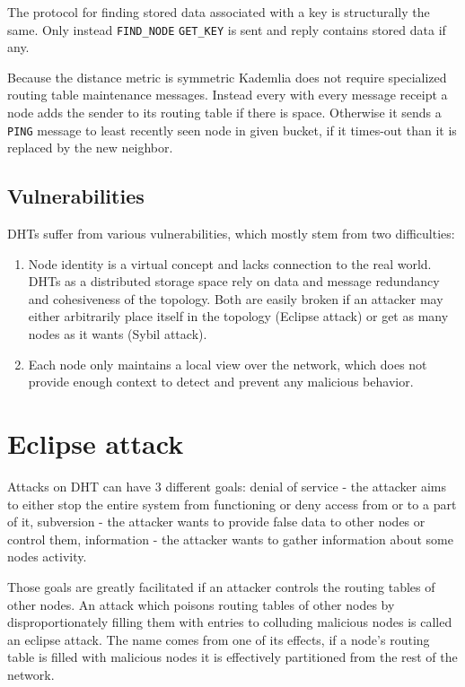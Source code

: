   The protocol for finding stored data associated with a key is structurally the
  same. Only instead \verb|FIND_NODE| \verb|GET_KEY| is sent and reply contains
  stored data if any.

  Because the distance metric is symmetric Kademlia does not require specialized
  routing table maintenance messages. Instead every with every message receipt
  a node adds the sender to its routing table if there is space. Otherwise it
  sends a \verb|PING| message to least recently seen node in given bucket, if it
  times-out than it is replaced by the new neighbor.

\subsection{Vulnerabilities}
  DHTs suffer from various vulnerabilities, which mostly stem
  from two difficulties:
  \begin{enumerate}
    \item Node identity is a virtual concept and lacks connection to the real
      world. DHTs as a distributed storage space rely on data and message
      redundancy and cohesiveness of the topology. Both are easily broken if an
      attacker may either arbitrarily place itself in the topology (Eclipse
      attack) or get as many nodes as it wants (Sybil attack).

    \item Each node only maintains a local view over the network, which does not
      provide enough context to detect and prevent any malicious behavior.
  \end{enumerate}

\section{Eclipse attack}
  Attacks on DHT can have 3 different goals:
  denial of service - the attacker aims to either stop the entire system from
  functioning or deny access from or to a part of it,
  subversion - the attacker wants to provide false data to other nodes or
  control them,
  information - the attacker wants to gather information about some nodes
  activity.

  Those goals are greatly facilitated if an attacker controls the routing tables
  of other nodes. An attack which poisons routing tables of other nodes by
  disproportionately filling them with entries to colluding malicious nodes is
  called an eclipse attack. The name comes from one of its effects, if a node's
  routing table is filled with malicious nodes it is effectively partitioned
  from the rest of the network.

